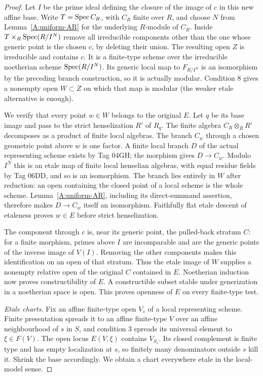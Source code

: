 \begin{proof}
Let $I$ be the prime ideal defining the closure of the image of
$c$ in this new affine base. Write $T=\operatorname{Spec} C_R$, with $C_R$ finite
over $R$, and choose $N$ from Lemma~\ref{A:uniform-AR} for the
underlying $R$-module of $C_R$. Inside
$T\times_R\operatorname{Spec}(R/I^N)$ remove all irreducible components other
than the one whose generic point is the chosen $c$, by deleting
their union. The resulting open $Z$ is irreducible and contains
$c$. It is a finite-type scheme over the irreducible noetherian
scheme $\operatorname{Spec}(R/I^N)$. Its generic local map to $F_{R/I^N}$ is an
isomorphism by the preceding branch construction, so it is actually
modular. Condition 8 gives a nonempty open $W\subset Z$ on which
that map is modular (the weaker etale alternative is enough).

We verify that every point $w\in W$ belongs to the original $E$.
Let $q$ be its base image and pass to the strict henselization
$R'$ of $R_q$. The finite algebra $C_R\otimes_RR'$ decomposes as
a product of finite local algebras. The branch $C_w$ through a
chosen geometric point above $w$ is one factor. A finite local
branch $D$ of the actual representing scheme exists by Tag 04GH;
the morphism gives $D\to C_w$. Modulo $I^N$ this is an etale map
of finite local henselian algebras, with equal residue fields by
Tag 06DD, and so is an isomorphism. The branch lies entirely in
$W$ after reduction: an open containing the closed point of a local
scheme is the whole scheme. Lemma~\ref{A:uniform-AR}, including
its direct-summand assertion, therefore makes $D\to C_w$ itself
an isomorphism. Faithfully flat etale descent of etaleness proves
$w\in E$ before strict henselization.

The component through $c$ is, near its generic point, the pulled-back
stratum $C$: for a finite morphism, primes above $I$ are incomparable
and are the generic points of the inverse image of $V(I)$. Removing
the other components makes this identification on an open of that
stratum. Thus the etale image of $W$ supplies a nonempty relative
open of the original $C$ contained in $E$. Noetherian induction
now proves constructibility of $E$. A constructible subset stable
under generization in a noetherian space is open. This proves
openness of $E$ on every finite-type test.

\emph{Etale charts.} Fix an affine finite-type open $V_s$ of a
local representing scheme. Finite presentation spreads it to an
affine finite-type $V$ over an affine neighbourhood of $s$ in $S$,
and condition 3 spreads its universal element to $\xi\in F(V)$.
The open locus $E(V,\xi)$ contains $V_{S_s}$. Its closed complement
is finite type and has empty localization at $s$, so finitely many
denominators outside $s$ kill it. Shrink the base accordingly.
We obtain a chart everywhere etale in the local-model sense.


\end{proof}
